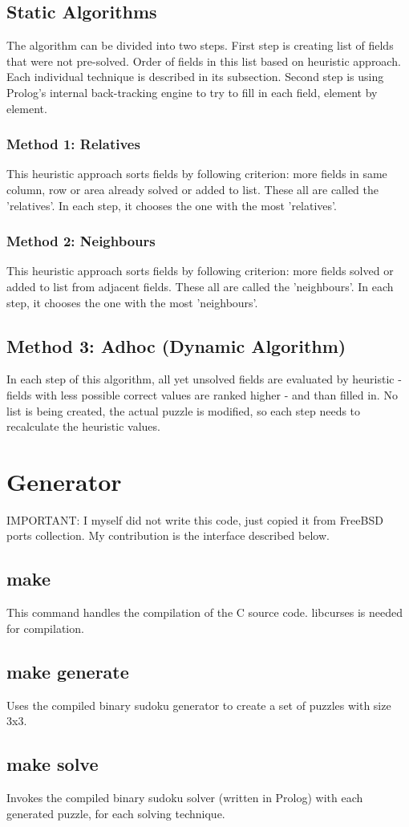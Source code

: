 \documentclass{article}
\begin{document}
\subsection{Static Algorithms}
The algorithm can be divided into two steps. First step is creating list of
fields that were not pre-solved. Order of fields in this list based on
heuristic approach.
Each individual technique is described in its subsection. Second step is using
Prolog’s internal back-tracking engine to try to fill in each field, element by
element.
\subsubsection{Method 1: Relatives}
This heuristic approach sorts fields by following criterion: more fields in
same column, row or area already solved or added to list. These all are called
the ’relatives’. In each step, it chooses the one with the most ’relatives’.
\subsubsection{Method 2: Neighbours}
This heuristic approach sorts fields by following criterion: more fields solved
or added to list from adjacent fields. These all are called the ’neighbours’.
In each step, it chooses the one with the most ’neighbours’.
\subsection{Method 3: Adhoc (Dynamic Algorithm)}
In each step of this algorithm, all yet unsolved fields are evaluated by
heuristic - fields with less possible correct values are ranked higher - and
than filled in. No list is being created, the actual puzzle is modified, so
each step needs to recalculate the heuristic values.
\section{Generator}
IMPORTANT: I myself did not write this code, just copied it from FreeBSD ports
collection. My contribution is the interface described below.
\subsection{make}
This command handles the compilation of the C source code. libcurses is needed
for compilation.
\subsection{make generate}
Uses the compiled binary sudoku generator to create a set of puzzles with size
3x3.
\subsection{make solve}
Invokes the compiled binary sudoku solver (written in Prolog) with each
generated puzzle, for each solving technique.
\end{document}
